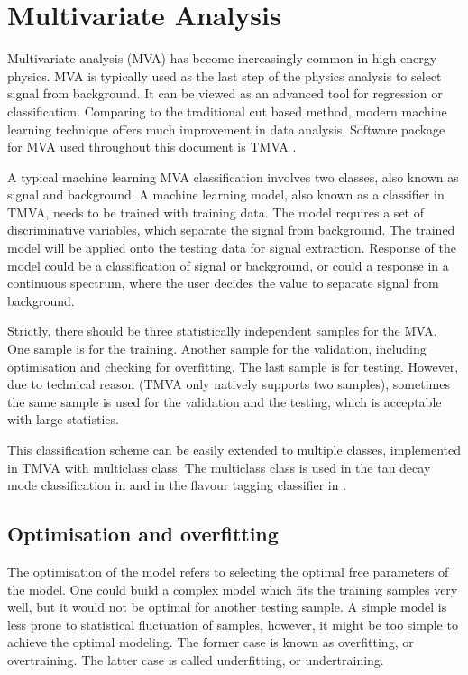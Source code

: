 \section{Multivariate Analysis}
\label{sec:pandoraMVA}

Multivariate analysis (MVA) has become increasingly common in high energy physics. MVA is typically used as the last step of the physics analysis to select signal from background. It can be viewed as an advanced tool for regression or classification. Comparing to the traditional cut based method, modern machine learning technique offers much improvement in data analysis. Software package for MVA used throughout this document is TMVA \cite{Hocker:2007ht}.

A typical machine learning MVA classification involves two classes, also known as signal and background. A machine learning model, also known as a classifier in TMVA, needs to be trained with training data. The model requires a set of discriminative variables, which separate the signal from background. The trained model will be applied onto the testing data for signal extraction. Response of the model could be a classification of signal or background, or could  a response in a continuous spectrum, where the user decides the value to separate signal from background.

Strictly, there should be three statistically independent samples for the MVA. One sample is for the training. Another sample for the validation, including optimisation and checking for overfitting. The last sample is for testing. However, due to technical reason (TMVA only natively supports two samples), sometimes the same sample is used for the validation and the testing, which is acceptable with large statistics.

This classification scheme can be easily extended to multiple classes, implemented in TMVA with multiclass class. The multiclass class is used in the tau decay mode classification in \Section{} and in the flavour tagging classifier in .

\subsection{Optimisation and overfitting}

The optimisation of the model refers to selecting the optimal free parameters of the model. One could build a complex model which fits the training samples very well, but it would not be optimal for another testing sample. A simple model is less prone to statistical fluctuation of samples, however, it might be too simple to achieve the optimal modeling. The former case is known as overfitting, or overtraining. The latter case is called underfitting, or undertraining.

